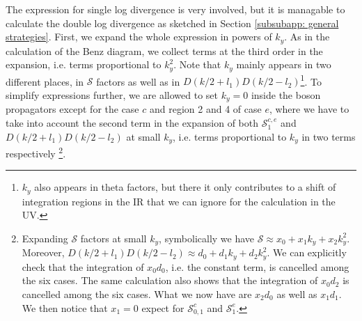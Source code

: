 \documentclass[prx,amsmath,amssymb, notitlepage, onecolumn,
nofootinbib,
superscriptaddress,
longbibliography
]{revtex4-1}
\newcommand{\mc}[1]{\mathcal{#1}}
\begin{document}
The expression for single log divergence is very involved, but it is managable to calculate the double log divergence as sketched in Section \ref{subsubapp: general strategies}. 
%
First, we expand the whole expression in powers of $k_y$. 
As in the calculation of the Benz diagram,
we collect terms at the third order in the expansion, i.e. terms proportional to $k_y^2$. 
Note that $k_y$ mainly appears in two different places, in $\mc{S}$ factors as well as in $D(k/2+l_1)D(k/2-l_2)$\footnote{$k_y$ also appears in theta factors, but there it only contributes to a shift of integration regions in the IR that we can ignore for the calculation in the UV.}. 
To simplify expressions further, we are allowed to set $k_y=0$ inside the boson propagators except for the case $c$ and region 2 and 4 of case $e$, where we have to take into account the second term in the expansion of both $\mc{S}^{c,e}_1$ and $D(k/2+l_1)D(k/2-l_2)$ at small $k_y$, i.e. terms proportional to $k_y$ in two terms respectively
\footnote{Expanding $\mc{S}$ factors at small $k_y$, symbolically we have $\mc{S}\approx x_0 + x_1 k_y + x_2 k_y^2$. 
Moreover, $D(k/2+l_1)D(k/2-l_2)\approx d_0 + d_1 k_y + d_2 k_y^2$. We can explicitly check that the integration of $x_0 d_0$, i.e. the constant term, is cancelled among the six cases. The same calculation also shows that the integration of $x_0 d_2$ is cancelled among the six cases. What we now have are $x_2 d_0$ as well as $x_1 d_1$. We then notice that $x_1=0$ expect for $\mc{S}^c_{0,1}$ and $\mc{S}^e_1$.}.
\end{document}
